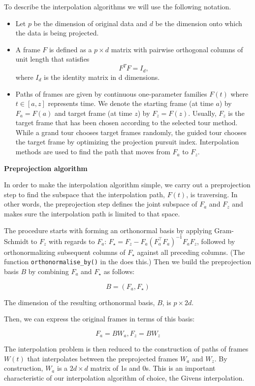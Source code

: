 To describe the interpolation algorithms we will use the following notation.

\begin{itemize}
\item
  Let \(p\) be the dimension of original data and \(d\) be the dimension onto which the data is being projected.
\item
  A frame \(F\) is defined as a \(p\times d\) matrix with pairwise orthogonal columns of unit length that satisfies
  \[F^TF = I_d,\]
  where \(I_d\) is the identity matrix in d dimensions.
\item
  Paths of frames are given by continuous one-parameter families \(F(t)\) where \(t\in [a, z]\) represents time. We denote the starting frame (at time \(a\)) by \(F_a = F(a)\) and target frame (at time \(z\)) by \(F_z = F(z)\). Usually, \(F_z\) is the target frame that has been chosen according to the selected tour method. While a grand tour chooses target frames randomly, the guided tour chooses the target frame by optimizing the projection pursuit index. Interpolation methods are used to find the path that moves from \(F_a\) to \(F_z\).
\end{itemize}

\textbf{Preprojection algorithm}

In order to make the interpolation algorithm simple, we carry out a preprojection step to find the subspace that the interpolation path, \(F(t)\), is traversing. In other words, the preprojection step defines the joint subspace of \(F_a\) and \(F_z\) and makes sure the interpolation path is limited to that space.

The procedure starts with forming an orthonormal basis by applying Gram-Schmidt to \(F_z\) with regards to \(F_a\): \(F_\star = F_z - F_a(F_a^\top F_a)^{-1}F_aF_z\), followed by orthonormalizing subsequent columns of \(F_\star\) against all preceding columns. (The function \texttt{orthonormalise\_by()} in the  does this.) Then we build the preprojection basis \(B\) by combining \(F_a\) and \(F_\star\) as follows:

\[B = (F_a, F_{\star})\]

The dimension of the resulting orthonormal basis, \(B\), is \(p\times 2d\).

Then, we can express the original frames in terms of this basis:

\[F_a = B W_a, F_z = B W_z\]

The interpolation problem is then reduced to the construction of paths of frames \(W(t)\) that interpolates between the preprojected frames \(W_a\) and \(W_z\). By construction, \(W_a\) is a \(2d\times d\) matrix of 1s and 0s. This is an important characteristic of our interpolation algorithm of choice, the Givens interpolation.

